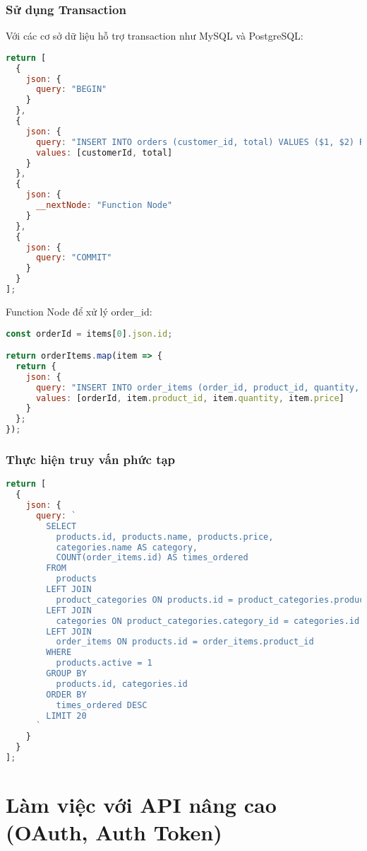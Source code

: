 \subsubsection{Sử dụng Transaction}

Với các cơ sở dữ liệu hỗ trợ transaction như MySQL và PostgreSQL:

\begin{lstlisting}[language=JavaScript]
return [
  {
    json: {
      query: "BEGIN"
    }
  },
  {
    json: {
      query: "INSERT INTO orders (customer_id, total) VALUES ($1, $2) RETURNING id",
      values: [customerId, total]
    }
  },
  {
    json: {
      __nextNode: "Function Node"
    }
  },
  {
    json: {
      query: "COMMIT"
    }
  }
];
\end{lstlisting}

Function Node để xử lý order\_id:
\begin{lstlisting}[language=JavaScript]
const orderId = items[0].json.id;

return orderItems.map(item => {
  return {
    json: {
      query: "INSERT INTO order_items (order_id, product_id, quantity, price) VALUES ($1, $2, $3, $4)",
      values: [orderId, item.product_id, item.quantity, item.price]
    }
  };
});
\end{lstlisting}
\subsubsection{Thực hiện truy vấn phức tạp}

\begin{lstlisting}[language=JavaScript]
return [
  {
    json: {
      query: `
        SELECT 
          products.id, products.name, products.price,
          categories.name AS category,
          COUNT(order_items.id) AS times_ordered
        FROM 
          products
        LEFT JOIN 
          product_categories ON products.id = product_categories.product_id
        LEFT JOIN 
          categories ON product_categories.category_id = categories.id
        LEFT JOIN 
          order_items ON products.id = order_items.product_id
        WHERE 
          products.active = 1
        GROUP BY 
          products.id, categories.id
        ORDER BY 
          times_ordered DESC
        LIMIT 20
      `
    }
  }
];
\end{lstlisting}

\section{Làm việc với API nâng cao (OAuth, Auth Token)}

